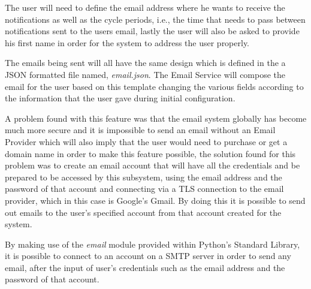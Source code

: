 \begin{enumerate}
The user will need to define the email address where he wants to receive the
notifications as well as the cycle periods, i.e., the time that needs to pass
between notifications sent to the users email, lastly the user will also be
asked to provide his first name in order for the system to address the user
properly.


The emails being sent will all have the same design which is defined in the a
JSON formatted file named, \emph{email.json}. The Email Service will compose the
email for the user based on this template changing the various fields according
to the information that the user gave during initial configuration.

A problem found with this feature was that the email system globally has become
much more secure and it is impossible to send an email without an Email Provider
which will also imply that the user would need to purchase or get a domain name
in order to make this feature possible, the solution found for this problem was
to create an email account that will have all the credentials and be prepared to
be accessed by this subsystem, using the email address and the password of that
account and connecting via a TLS connection to the email provider, which in this
case is Google's Gmail. By doing this it is possible to send out emails to the
user's specified account from that account created for the system.

By making use of the \emph{email} module provided within Python's Standard
Library, it is possible to connect to an account on a SMTP server in order to
send any email, after the input of user's credentials such as the email address
and the password of that account.




\end{enumerate}
